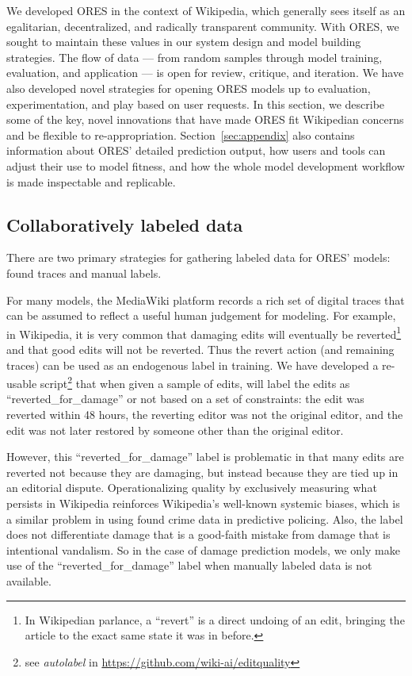 We developed ORES in the context of Wikipedia, which generally sees itself as an egalitarian, decentralized, and radically transparent community.  With ORES, we sought to maintain these values in our system design and model building strategies.  The flow of data --- from random samples through model training, evaluation, and application --- is open for review, critique, and iteration.  We have also developed novel strategies for opening ORES models up to evaluation, experimentation, and play based on user requests.  In this section, we describe some of the key, novel innovations that have made ORES fit Wikipedian concerns and be flexible to re-appropriation.  Section~\ref{sec:appendix} also contains information about ORES' detailed prediction output, how users and tools can adjust their use to model fitness, and how the whole model development workflow is made inspectable and replicable.

\subsection{Collaboratively labeled data}
There are two primary strategies for gathering labeled data for ORES' models: found traces and manual labels.

 For many models, the MediaWiki platform records a rich set of digital traces that can be assumed to reflect a useful human judgement for modeling.  For example, in Wikipedia, it is very common that damaging edits will eventually be reverted\footnote{In Wikipedian parlance, a ``revert'' is a direct undoing of an edit, bringing the article to the exact same state it was in before.} and that good edits will not be reverted.  Thus the revert action (and remaining traces) can be used as an endogenous label in training.  We have developed a re-usable script\footnote{see \emph{autolabel} in \url{https://github.com/wiki-ai/editquality}} that when given a sample of edits, will label the edits as ``reverted\_for\_damage'' or not based on a set of constraints: the edit was reverted within 48 hours, the reverting editor was not the original editor, and the edit was not later restored by someone other than the original editor.

However, this ``reverted\_for\_damage'' label is problematic in that many edits are reverted not because they are damaging, but instead because they are tied up in an editorial dispute.  Operationalizing quality by exclusively measuring what persists in Wikipedia reinforces Wikipedia's well-known systemic biases, which is a similar problem in using found crime data in predictive policing.  Also, the label does not differentiate damage that is a good-faith mistake from damage that is intentional vandalism.  So in the case of damage prediction models, we only make use of the ``reverted\_for\_damage'' label when manually labeled data is not available.

